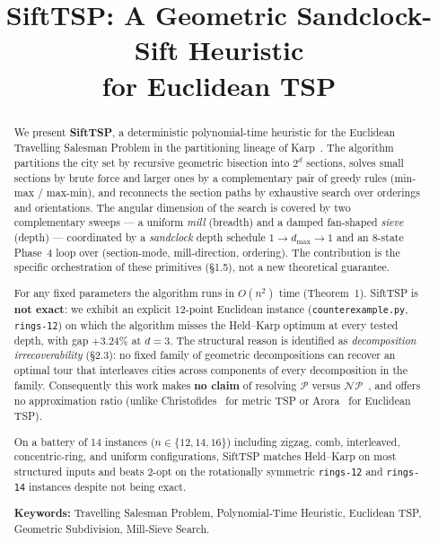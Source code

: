 \documentclass[11pt,a4paper]{article}
\title{SiftTSP: A Geometric Sandclock-Sift Heuristic\\ for Euclidean TSP}
\author{}
\date{}
\begin{document}
\maketitle

\begin{abstract}
We present \textbf{SiftTSP}, a deterministic polynomial-time heuristic for the
Euclidean Travelling Salesman Problem in the partitioning lineage of
Karp~\cite{karp1977}. The algorithm partitions the city set by recursive geometric
bisection into $2^d$ sections, solves small sections by brute force and
larger ones by a complementary pair of greedy rules (min-max / max-min),
and reconnects the section paths by exhaustive search over orderings and
orientations. The angular dimension of the search is covered by two
complementary sweeps --- a uniform \emph{mill} (breadth) and a damped
fan-shaped \emph{sieve} (depth) --- coordinated by a \emph{sandclock}
depth schedule $1 \to d_{\max} \to 1$ and an 8-state Phase~4 loop over
(section-mode, mill-direction, ordering). The contribution is the
specific orchestration of these primitives (\S1.5), not a new
theoretical guarantee.

For any fixed parameters the algorithm runs in $O(n^2)$ time
(Theorem~1). SiftTSP is \textbf{not exact}: we exhibit an explicit
12-point Euclidean instance (\texttt{counterexample.py}, \texttt{rings-12})
on which the algorithm misses the Held--Karp optimum at every tested
depth, with gap $+3.24\%$ at $d=3$. The structural reason is identified
as \emph{decomposition irrecoverability} (\S2.3): no fixed family of
geometric decompositions can recover an optimal tour that interleaves
cities across components of every decomposition in the family.
Consequently this work makes \textbf{no claim} of resolving
$\mathcal{P}$ versus $\mathcal{NP}$~\cite{cook1971,levin1973,aaronson2009}, and offers no
approximation ratio (unlike Christofides~\cite{christofides1976} for metric TSP or
Arora~\cite{arora1998} for Euclidean TSP).

On a battery of 14 instances ($n \in \{12, 14, 16\}$) including zigzag,
comb, interleaved, concentric-ring, and uniform configurations, SiftTSP
matches Held--Karp on most structured inputs and beats 2-opt on the
rotationally symmetric \texttt{rings-12} and \texttt{rings-14} instances
despite not being exact.

\medskip
\noindent\textbf{Keywords:} Travelling Salesman Problem, Polynomial-Time
Heuristic, Euclidean TSP, Geometric Subdivision, Mill-Sieve Search.
\end{abstract}
\end{document}
